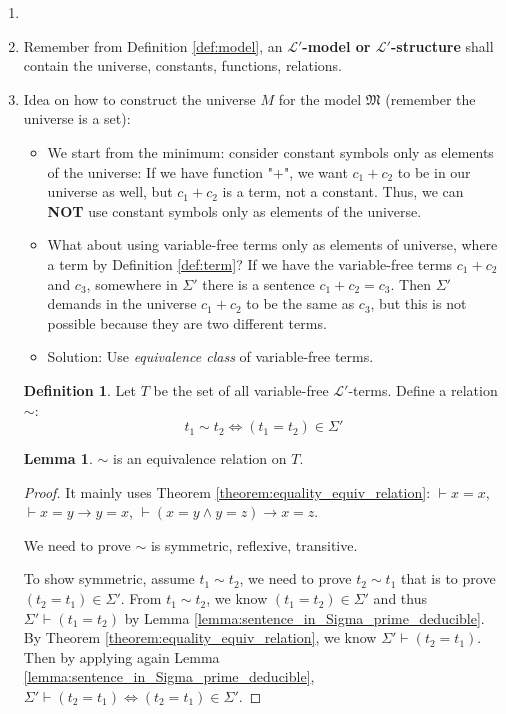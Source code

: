 \documentclass[11pt,letterpaper]{book}
\theoremstyle{definition}
\newtheorem{definition}{Definition}[section]
\newtheorem{lemma}{Lemma}[section]
\begin{document}
\begin{enumerate}
\item[]
\item{Remember from Definition \ref{def:model}, an
\textbf{$\mathcal{L}'$-model or $\mathcal{L}'$-structure} shall contain
the universe, constants, functions, relations.}
\item{Idea on how to construct the universe $M$ for the model
$\mathfrak{M}$ (remember the universe is a set):}

\begin{itemize}
\item{We start from the minimum: consider constant symbols only as
elements of the universe: If we have function "+", we want $c_1 + c_2$
to be in our universe as well, but $c_1 + c_2$ is a term, not a
constant. Thus, we can \textbf{NOT} use constant symbols only as
elements of the universe.}
    \item{What about using variable-free terms only as elements of
universe, where a term by Definition \ref{def:term}? If we have the
variable-free terms $c_1 + c_2$ and $ c_3$, somewhere in $\Sigma'$ there
is a sentence $c_1 + c_2 = c_3$. Then $\Sigma'$ demands in the universe
$c_1 + c_2$ to be the same as $c_3$, but this is not possible because
they are two different terms.}
    \item{Solution: Use \emph{equivalence class} of variable-free terms.}
\end{itemize}

\begin{definition}\label{def:sim_equivalence_relation}
Let $T$ be the set of all variable-free $\mathcal{L}'$-terms. Define a
relation $ \sim $:
$$ t_1 \sim t_2 \iff (t_1 = t_2) \in \Sigma' $$
\end{definition}

\begin{lemma}
$ \sim $ is an equivalence relation on $T$.
\end{lemma}

\begin{proof}
It mainly uses Theorem \ref{theorem:equality_equiv_relation}: $\vdash x
= x$, $\vdash x=y \rightarrow y=x$, $\vdash (x=y \land y=z) \rightarrow
x=z $.

We need to prove $\sim$ is symmetric, reflexive, transitive.

To show symmetric, assume $t_1 \sim t_2$, we need to prove $t_2 \sim
t_1$ that is to prove $(t_2 = t_1) \in \Sigma'$. From $t_1 \sim t_2$, we
know $(t_1 = t_2) \in \Sigma' $ and thus $\Sigma' \vdash (t_1 = t_2)$ by
Lemma \ref{lemma:sentence_in_Sigma_prime_deducible}. By Theorem
\ref{theorem:equality_equiv_relation}, we know $\Sigma' \vdash (t_2 =
t_1) $. Then by applying again Lemma
\ref{lemma:sentence_in_Sigma_prime_deducible}, $\Sigma' \vdash (t_2 =
t_1) \iff (t_2 = t_1 ) \in \Sigma'$.



\end{proof}
\end{enumerate}
\end{document}

